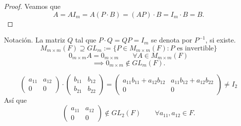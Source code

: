 \documentclass[12pt,a4paper]{book}
\begin{document}
    \begin{proof}
        Veamos que
        \begin{equation*}
        A=AI_{m}=A(P\cdot B)=(AP)\cdot B= I_{m}\cdot B=B.
        \end{equation*}
    \end{proof}

    Notación. La matriz $Q$ tal que $P\cdot Q=QP=I_{m}$ se denota por $P^{-1}$, si existe.
    \begin{equation*}
        M_{m\times m}(F)\supseteq GL_{m}:=\{P\in M_{m\times m}(F):P\text{ es invertible}\}
    \end{equation*}
    \begin{equation*}
        0_{m\times m}A=0_{m\times m}\qquad\forall A\in M_{m\times m}(F)
    \end{equation*}
    \begin{equation*}
        \implies0_{m\times m}\notin GL_{m}(F).
    \end{equation*}

    \begin{ejemplo}
    \label{ej:13}
        \begin{equation*}
            \begin{pmatrix}
                a_{11} & a_{12}\\
                0 & 0
            \end{pmatrix}
            \cdot
            \begin{pmatrix}
                b_{11} & b_{12}\\
                b_{21} & b_{22}
            \end{pmatrix}
            =
            \begin{pmatrix}
                a_{11}b_{11}+a_{12}b_{12} & a_{11}b_{12}+a_{12}b_{22}\\
                0 & 0
            \end{pmatrix}
            \neq I_{2}
        \end{equation*}
        Así que
        \begin{equation*}
            \begin{pmatrix}
                a_{11} & a_{12}\\
                0 & 0
            \end{pmatrix}
            \notin GL_{2}(F)\qquad\forall a_{11},a_{12}\in F.
        \end{equation*}
    \end{ejemplo}
\end{document}
